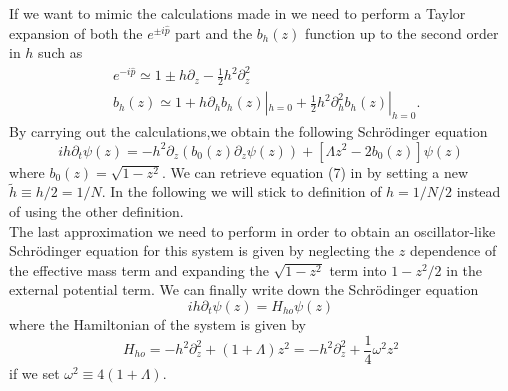 If we want to mimic the calculations made in \cite{FastGenerationJulia2012} we need to perform a Taylor expansion of both the $ e^{\pm i\hat{p}} $ part and the $ b_{h}(z) $ function up to the second order in $ h $ such as
\begin{align}
	 & e^{-i\hat{p}}  \simeq 1 \pm h \partial_{z} - \frac{1}{2}h^2\partial^2_{z} \label{eq:TaylorExpansionExp }                         \\
	 & b_{h}(z) \simeq  1 + h \partial_{h}b_{h}(z)|_{h = 0} + \frac{1}{2}h^2\partial_h^2b_{h}(z)|_{h = 0} \label{eq:TaylorExpansionB }.
\end{align}
By carrying out the calculations,we obtain the following Schr{\"o}dinger equation
\begin{equation}
	\label{eq:TaylorExpansionHamiltonian}
	ih\partial_t\psi(z) =
	-h^2\partial_z\left(b_{0}(z)\partial_z\psi(z) \right)+
	\left[ 	\Lambda z^2 - 2b_{0}(z) \right] \psi(z)
\end{equation}
where $ b_{0}(z) = \sqrt{1-z^2}  $.
We can retrieve equation (7) in \cite{FastGenerationJulia2012} by setting a new $ \tilde{h} \equiv h/2 = 1/N $.
In the following we will stick to definition of $ h = 1/N/2 $ instead of using the other definition.\\
The last approximation we need to perform in order to obtain an oscillator-like Schr{\"o}dinger equation for this system is given by neglecting the $ z $ dependence of the effective mass term and expanding the $ \sqrt{1 - z^2}  $ term into $ 1 - z^2/2 $ in the external potential term. We can finally write down the Schr{\"o}dinger equation
\begin{equation}
	\label{eq:SchrodingerEquationHarmonicLike}
	ih\partial_t\psi(z) = H_{ho}\psi(z)
\end{equation}
where the Hamiltonian of the system is given by
\begin{equation}
	\label{eq:HamiltonianJosephsonJunctionHarmonic}
	H_{ho} = -h^2\partial_z^2 + (1 + \Lambda)z^2  =
	-h^2\partial_z^2 + \frac{1}{4}\omega^2 z^2
\end{equation}
if we set $ \omega^2 \equiv 4(1+\Lambda) $.
